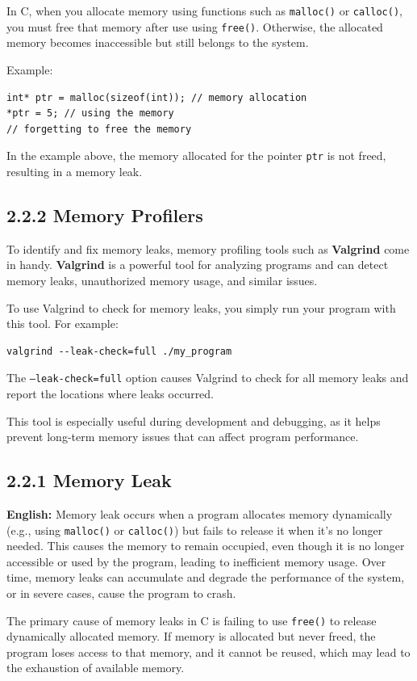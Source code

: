\documentclass{article}
\begin{document}
In C, when you allocate memory using functions such as \texttt{malloc()} or \texttt{calloc()}, you must free that memory after use using \texttt{free()}. Otherwise, the allocated memory becomes inaccessible but still belongs to the system.

Example:
\begin{verbatim}
int* ptr = malloc(sizeof(int)); // memory allocation
*ptr = 5; // using the memory
// forgetting to free the memory
\end{verbatim}
In the example above, the memory allocated for the pointer \texttt{ptr} is not freed, resulting in a memory leak.

\subsection*{2.2.2 Memory Profilers}
To identify and fix memory leaks, memory profiling tools such as \textbf{Valgrind} come in handy. \textbf{Valgrind} is a powerful tool for analyzing programs and can detect memory leaks, unauthorized memory usage, and similar issues.

To use Valgrind to check for memory leaks, you simply run your program with this tool. For example:
\begin{verbatim}
valgrind --leak-check=full ./my_program
\end{verbatim}
The \texttt{--leak-check=full} option causes Valgrind to check for all memory leaks and report the locations where leaks occurred.

This tool is especially useful during development and debugging, as it helps prevent long-term memory issues that can affect program performance.






\subsection*{2.2.1 Memory Leak}
\textbf{English:} 
Memory leak occurs when a program allocates memory dynamically (e.g., using \texttt{malloc()} or \texttt{calloc()}) but fails to release it when it's no longer needed. This causes the memory to remain occupied, even though it is no longer accessible or used by the program, leading to inefficient memory usage. Over time, memory leaks can accumulate and degrade the performance of the system, or in severe cases, cause the program to crash.

The primary cause of memory leaks in C is failing to use \texttt{free()} to release dynamically allocated memory. If memory is allocated but never freed, the program loses access to that memory, and it cannot be reused, which may lead to the exhaustion of available memory.
\end{document}
